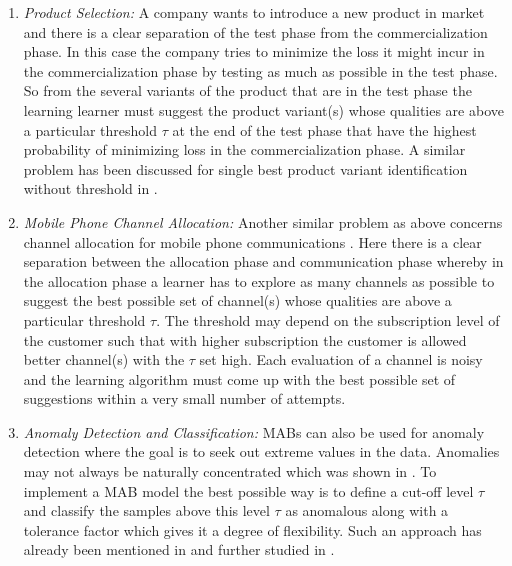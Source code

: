 \begin{enumerate}
\item \emph{Product Selection:} A company wants to introduce a new product in market and there is a clear separation of the test phase from the commercialization phase. In this case the company tries to minimize the loss it might incur in the commercialization phase by testing as much as possible in the test phase. So from the several variants of the product that are in the test phase the learning learner must suggest the product variant(s) whose qualities are above a particular threshold $\tau$ at the end of the test phase that have the highest probability of minimizing loss in the commercialization phase. A similar problem has been discussed for single best product variant identification without threshold in \citet{bubeck2011pure}. 
\item \emph{Mobile Phone Channel Allocation:} Another similar problem as above concerns channel allocation for mobile phone communications \citep{audibert2009exploration}. Here there is a clear separation between the allocation phase and communication phase whereby in the allocation phase a learner has to explore as many channels as possible to suggest the best possible set of channel(s) whose qualities are above a particular threshold $\tau$. The threshold may depend on the subscription level of the customer such that with higher subscription the customer is allowed better channel(s) with the $\tau$ set high. Each evaluation of a channel is noisy and the learning algorithm must come up with the best possible set of suggestions within a very small  number of attempts.
\item \emph{Anomaly Detection and Classification:} MABs can also be used for anomaly detection where the goal is to seek out extreme values in the data. Anomalies may not always be naturally concentrated which was shown in  \citet{steinwart2005classification}. To implement a MAB model the best possible way is to define a cut-off level $\tau$ and classify the samples above this level $\tau$ as anomalous along with a tolerance factor which gives it a degree of flexibility. Such an approach has already been mentioned in \citet{streeter2006selecting} and further studied in \citet{locatelli2016optimal}.
\end{enumerate}


